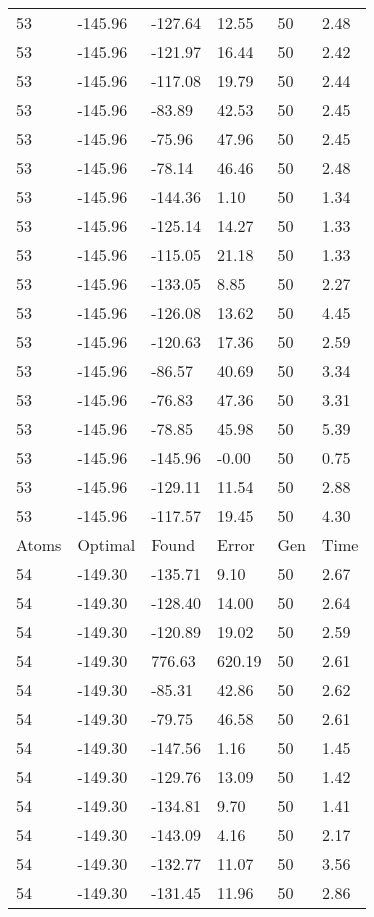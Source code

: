 \documentclass{report}
\begin{document}
\begin{appendix}
\begin{longtable}{llllll}
53 & -145.96 & -127.64 & 12.55 & 50 & 2.48 \\
53 & -145.96 & -121.97 & 16.44 & 50 & 2.42 \\
53 & -145.96 & -117.08 & 19.79 & 50 & 2.44 \\
53 & -145.96 & -83.89 & 42.53 & 50 & 2.45 \\
53 & -145.96 & -75.96 & 47.96 & 50 & 2.45 \\
53 & -145.96 & -78.14 & 46.46 & 50 & 2.48 \\
53 & -145.96 & -144.36 & 1.10 & 50 & 1.34 \\
53 & -145.96 & -125.14 & 14.27 & 50 & 1.33 \\
53 & -145.96 & -115.05 & 21.18 & 50 & 1.33 \\
53 & -145.96 & -133.05 & 8.85 & 50 & 2.27 \\
53 & -145.96 & -126.08 & 13.62 & 50 & 4.45 \\
53 & -145.96 & -120.63 & 17.36 & 50 & 2.59 \\
53 & -145.96 & -86.57 & 40.69 & 50 & 3.34 \\
53 & -145.96 & -76.83 & 47.36 & 50 & 3.31 \\
53 & -145.96 & -78.85 & 45.98 & 50 & 5.39 \\
53 & -145.96 & -145.96 & -0.00 & 50 & 0.75 \\
53 & -145.96 & -129.11 & 11.54 & 50 & 2.88 \\
53 & -145.96 & -117.57 & 19.45 & 50 & 4.30 \\
Atoms & Optimal & Found & Error & Gen & Time \\
54 & -149.30 & -135.71 & 9.10 & 50 & 2.67 \\
54 & -149.30 & -128.40 & 14.00 & 50 & 2.64 \\
54 & -149.30 & -120.89 & 19.02 & 50 & 2.59 \\
54 & -149.30 & 776.63 & 620.19 & 50 & 2.61 \\
54 & -149.30 & -85.31 & 42.86 & 50 & 2.62 \\
54 & -149.30 & -79.75 & 46.58 & 50 & 2.61 \\
54 & -149.30 & -147.56 & 1.16 & 50 & 1.45 \\
54 & -149.30 & -129.76 & 13.09 & 50 & 1.42 \\
54 & -149.30 & -134.81 & 9.70 & 50 & 1.41 \\
54 & -149.30 & -143.09 & 4.16 & 50 & 2.17 \\
54 & -149.30 & -132.77 & 11.07 & 50 & 3.56 \\
54 & -149.30 & -131.45 & 11.96 & 50 & 2.86 \\

\end{longtable}
\end{appendix}
\end{document}
